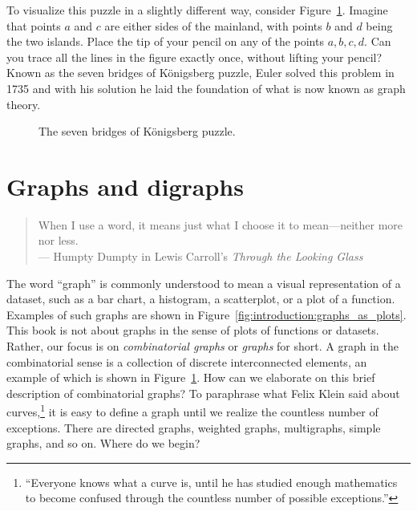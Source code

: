 To visualize this puzzle in a slightly different way, consider
Figure~\ref{fig:introduction:seven_bridges_Konigsberg}. Imagine that
points $a$ and $c$ are either sides of the mainland, with points $b$
and $d$ being the two islands. Place the tip of your pencil on any of
the points $a,b,c,d$. Can you trace all the lines in the figure
exactly once, without lifting your pencil? Known as the seven bridges
of K\"onigsberg puzzle, Euler solved this problem in 1735 and with his
solution he laid the foundation of what is now known as graph theory.

\begin{figure}[!htbp]
\centering

\caption{The seven bridges of K\"onigsberg puzzle.}
\label{fig:introduction:seven_bridges_Konigsberg}
\end{figure}



\newpage

\section{Graphs and digraphs}
\label{sec:introduction:graphs_digraphs}

\begin{quote}
When I use a word, it means just what I choose it to mean---neither
more nor less.\\
\noindent
--- Humpty Dumpty in
Lewis Carroll's
\emph{Through the Looking Glass}
\end{quote}

\noindent
The word ``graph'' is commonly understood to mean a visual
representation of a dataset, such as a bar chart, a histogram, a
scatterplot, or a plot of a function. Examples of such graphs are
shown in Figure~\ref{fig:introduction:graphs_as_plots}. This book is
not about graphs in the sense of plots of functions or
datasets. Rather, our focus is on
\emph{combinatorial graphs} or
\emph{graphs} for short. A graph in the combinatorial sense is a
collection of discrete interconnected elements, an example of which is
shown in Figure~\ref{fig:introduction:seven_bridges_Konigsberg}. How
can we elaborate on this brief description of combinatorial graphs? To
paraphrase what Felix Klein said about curves,\footnote{
  ``Everyone knows what a curve is, until he has studied enough
  mathematics to become confused through the countless number of
  possible exceptions.''
}
it is easy to define a graph until we realize the countless number of
exceptions. There are directed graphs, weighted graphs, multigraphs,
simple graphs, and so on. Where do we begin?

